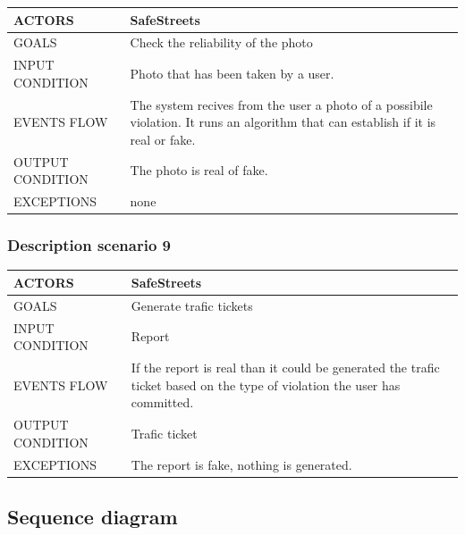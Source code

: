 \begin{center}
	\begin{tabular}{ | l | p{6cm} | } 
		\hline
		ACTORS & SafeStreets  \\ 
		\hline
		GOALS & Check the reliability of the photo  \\ 
		\hline
		INPUT CONDITION & Photo that has been taken by a user.  \\ 
		\hline
		EVENTS FLOW & The system recives from the user a photo of a possibile violation. It runs an algorithm that can establish if it is real or fake. \\ 
		\hline
		OUTPUT CONDITION & The photo is real of fake. \\ 
		\hline
		EXCEPTIONS & none \\ 
		\hline
	\end{tabular}
\end{center}

\subsubsection{Description scenario 9}

\begin{center}
	\begin{tabular}{ | l | p{6cm} | } 
		\hline
		ACTORS & SafeStreets  \\ 
		\hline
		GOALS & Generate trafic tickets  \\ 
		\hline
		INPUT CONDITION & Report  \\ 
		\hline
		EVENTS FLOW & If the report is real than it could be generated the trafic ticket based on the type of violation the user has committed. \\ 
		\hline
		OUTPUT CONDITION & Trafic ticket \\ 
		\hline
		EXCEPTIONS & The report is fake, nothing is generated. \\ 
		\hline
	\end{tabular}
\end{center}
\newpage
\subsection{Sequence diagram}
